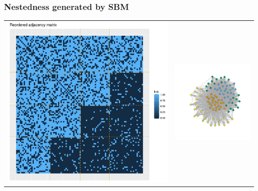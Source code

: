 \documentclass[compress,10pt]{beamer}
\begin{document}
\begin{frame}
\frametitle{Nestedness  generated by SBM}

\centering
\begin{tabular}{cc}
 \includegraphics[scale=.2]{plots/Nested_reordered_adja_with_groups.png}&
\includegraphics[scale=.2]{plots/Nested_graphe_with_colors.png} 
 \end{tabular}


\end{frame}
\end{document}
